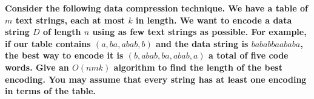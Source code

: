 \textbf{Consider the following data compression technique. We have a table of $m$ text strings, each at most $k$ in length. We want to encode a data string $D$ of length $n$ using as few text strings as possible. For example, if our table contains $(a,ba,abab,b)$ and the data string is $bababbaababa$, the best way to encode it is $(b,abab,ba,abab,a)$ a total of five code words. Give an $O(nmk)$ algorithm to find the length of the best encoding. You may assume that every string has at least one encoding in terms of the table.}\vspace{.2cm}

\textcolor{bibi}{}
\begin{quote}
\end{quote}